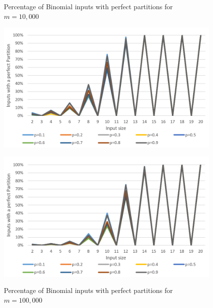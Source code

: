 \begin{figure}[h]
      \centering
      \begin{minipage}[b]{0.45\textwidth}
            \caption{Percentage of Binomial inputs with perfect partitions for $m = 10,000$}
            \includegraphics[width=\textwidth]{figures/images/solvabilityOfInputs/binomial_Input_Solvable_m10000.png}
      \end{minipage}
      \hspace{0.75cm}
      \begin{minipage}[b]{0.45\textwidth}
            \caption{Percentage of Binomial inputs with perfect partitions for $m = 100,000$}
            \includegraphics[width=\textwidth]{figures/images/solvabilityOfInputs/binomial_Input_Solvable_m100000.png}\label{fig:lastBinPercentage}
      \end{minipage}
\end{figure}



